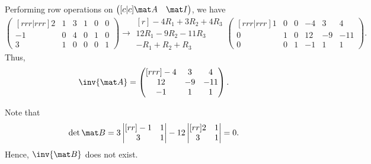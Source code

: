 \begin{solution}
    Performing row operations on $\begin{pmatrix}[c|c]\mat A & \mat I\end{pmatrix}$, we have \[\begin{pmatrix}[rrr|rrr]2 & 1 & 3 & 1 & 0 & 0 \\ -1 & 0 & 4 & 0 & 1 & 0\\ 3 & 1 & 0 & 0 & 0 & 1\end{pmatrix} \rightarrow \begin{matrix}[r]\scriptstyle -4 R_1 + 3R_2 + 4R_3 \\ \scriptstyle 12R_1 -9 R_2 - 11R_3 \\ \scriptstyle -R_1 + R_2 + R_3 \end{matrix}\begin{pmatrix}[rrr|rrr]1 & 0 & 0 & -4 & 3 & 4 \\ 0 & 1 & 0 & 12 & -9 & -11 \\ 0 & 0 & 1 & -1 & 1 & 1\end{pmatrix}.\] Thus, \[\inv{\mat A} = \begin{pmatrix}[rrr]-4 & 3 & 4 \\ 12 & -9 & -11 \\ -1 & 1 & 1\end{pmatrix}.\]

    Note that \[\det \mat B = 3\begin{vmatrix}[rr]-1 & 1 \\ 3 & 1\end{vmatrix} - 12 \begin{vmatrix}[rr]2 & 1 \\ 3 & 1\end{vmatrix} = 0.\] Hence, $\inv{\mat B}$ does not exist.


\end{solution}
